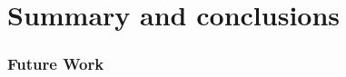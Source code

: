 \documentclass[../main.tex]{subfiles}
\begin{document}
\chapter{Summary and conclusions}

\subsection{Future Work}
\end{document}
